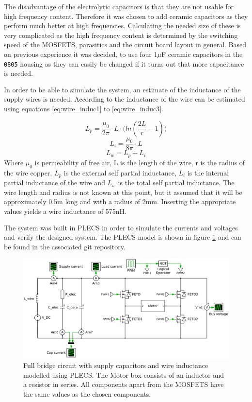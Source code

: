 The disadvantage of the electrolytic capacitors is that they are not usable for high frequency content.
Therefore it was chosen to add ceramic capacitors as they perform much better at high frequencies. 
Calculating the needed size of these is very complicated as the high frequency content is determined by the switching speed of the MOSFETS, parasitics and the circuit board layout in general. 
Based on previous experience it was decided, to use four 1$\mu$F ceramic capacitors in the \texttt{0805} housing as they can easily be changed if it turns out that more capacitance is needed.

In order to be able to simulate the system, an estimate of the inductance of the supply wires is needed.
According to \cite{partial_induc} the inductance of the wire can be estimated using equations \ref{eq:wire_induc1} to \ref{eq:wire_induc3}.

\begin{equation}
	L_p = \frac{\mu_0}{2 \pi} \cdot L \cdot \big(ln(\frac{2L}{r}-1)\big)
	\label{eq:wire_induc1}
\end{equation}
\begin{equation}
	L_i = \frac{\mu_0}{8 \pi} \cdot L
\end{equation}
\begin{equation}
	L_w = L_p + L_i
	\label{eq:wire_induc3}
\end{equation}
Where $\mu_0$ is permeability of free air, L is the length of the wire, r is the radius of the wire copper, $L_p$ is the external self partial inductance, $L_i$ is the internal partial inductance of the wire and $L_w$ is the total self partial inductance.
The wire length and radius is not known at this point, but it assumed that it will be approximately 0.5m long and with a radius of 2mm. 
Inserting the appropriate values yields a wire inductance of 575nH.

The system was built in PLECS in order to simulate the currents and voltages and verify the designed system.
The PLECS model is shown in figure \ref{fig:plecs_schem} and can be found in the associated git repository.

\begin{figure}[h]
	\centering
	\includegraphics[width=1\linewidth]{graphics/plecs_schem.png}
	\caption[Full bridge circuit modelled in PLECS.]{Full bridge circuit with supply capacitors and wire inductance modelled using PLECS. The Motor box consists of an inductor and a resistor in series. All components apart from the MOSFETS have the same values as the chosen components.}
	\label{fig:plecs_schem}
\end{figure}	

